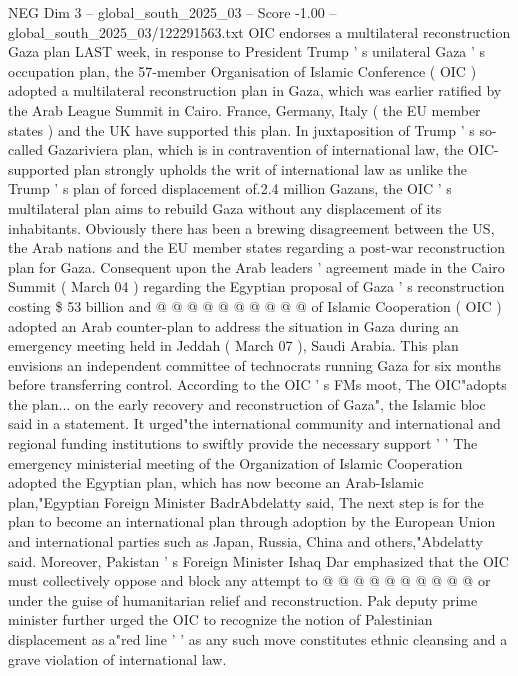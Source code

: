 \begin{textsample}{NEG Dim 3 – global\_south\_2025\_03 – Score -1.00 – global\_south\_2025\_03/122291563.txt}  \label{ex:f3_neg_420}
OIC endorses a multilateral reconstruction Gaza plan LAST week, in response to President Trump ' s unilateral Gaza ' s occupation plan, the 57-member Organisation of Islamic Conference ( OIC ) adopted a multilateral reconstruction plan in Gaza, which was earlier ratified by the Arab League Summit in Cairo.
France, Germany, Italy ( the EU member states ) and the UK have supported this plan.
In juxtaposition of Trump ' s so-called Gazariviera plan, which is in contravention of international law, the OIC-supported plan strongly upholds the writ of international law as unlike the Trump ' s plan of forced displacement of.2.4 million Gazans, the OIC ' s multilateral plan aims to rebuild Gaza without any displacement of its inhabitants.
Obviously there has been a brewing disagreement between the US, the Arab nations and the EU member states regarding a post-war reconstruction plan for Gaza.
Consequent upon the Arab leaders ' agreement made in the Cairo Summit ( March 04 ) regarding the Egyptian proposal of Gaza ' s reconstruction costing \$ 53 billion and @ @ @ @ @ @ @ @ @ @ of Islamic Cooperation ( OIC ) adopted an Arab counter-plan to address the situation in Gaza during an emergency meeting held in Jeddah ( March 07 ), Saudi Arabia.
This plan envisions an independent committee of technocrats running Gaza for six months before transferring control.
According to the OIC ' s FMs moot, The OIC"adopts the plan... on the early recovery and reconstruction of Gaza", the Islamic bloc said in a statement.
It urged"the international community and international and regional funding institutions to swiftly provide the necessary support ' ' The emergency ministerial meeting of the Organization of Islamic Cooperation adopted the Egyptian plan, which has now become an Arab-Islamic plan,"Egyptian Foreign Minister BadrAbdelatty said, The next step is for the plan to become an international plan through adoption by the European Union and international parties such as Japan, Russia, China and others,"Abdelatty said.
Moreover, Pakistan ' s Foreign Minister Ishaq Dar emphasized that the OIC must collectively oppose and block any attempt to @ @ @ @ @ @ @ @ @ @ or under the guise of humanitarian relief and reconstruction.
Pak deputy prime minister further urged the OIC to recognize the notion of Palestinian displacement as a"red line ' ' as any such move constitutes ethnic cleansing and a grave violation of international law.

\end{textsample}

